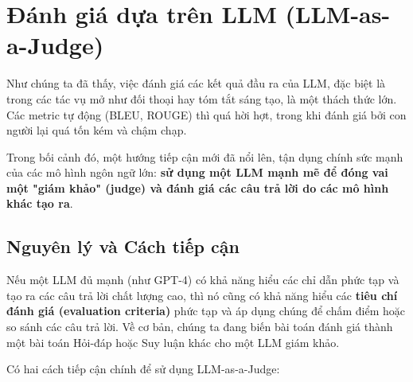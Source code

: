
\section{Đánh giá dựa trên LLM (LLM-as-a-Judge)}
\label{sec:llm_as_a_judge}

Như chúng ta đã thấy, việc đánh giá các kết quả đầu ra của LLM, đặc biệt là trong các tác vụ mở như đối thoại hay tóm tắt sáng tạo, là một thách thức lớn. Các metric tự động (BLEU, ROUGE) thì quá hời hợt, trong khi đánh giá bởi con người lại quá tốn kém và chậm chạp.

Trong bối cảnh đó, một hướng tiếp cận mới đã nổi lên, tận dụng chính sức mạnh của các mô hình ngôn ngữ lớn: \textbf{sử dụng một LLM mạnh mẽ để đóng vai một "giám khảo" (judge) và đánh giá các câu trả lời do các mô hình khác tạo ra}.

\subsection{Nguyên lý và Cách tiếp cận}
\label{ssec:llm_judge_principles}

\begin{tcolorbox}[
    title=Trực giác cốt lõi,
    colback=green!5!white, colframe=green!60!black, fonttitle=\bfseries
]
Nếu một LLM đủ mạnh (như GPT-4) có khả năng hiểu các chỉ dẫn phức tạp và tạo ra các câu trả lời chất lượng cao, thì nó cũng có khả năng hiểu các \textbf{tiêu chí đánh giá (evaluation criteria)} phức tạp và áp dụng chúng để chấm điểm hoặc so sánh các câu trả lời. Về cơ bản, chúng ta đang biến bài toán đánh giá thành một bài toán Hỏi-đáp hoặc Suy luận khác cho một LLM giám khảo.
\end{tcolorbox}

Có hai cách tiếp cận chính để sử dụng LLM-as-a-Judge:

